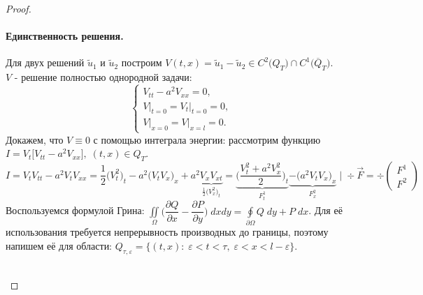 \documentclass[../main.tex]{subfiles}
\begin{document}
\begin{proof}
\paragraph{Единственность решения.}
Для двух решений $\tilde{u}_{1}$ и $\tilde{u}_{2}$  построим $V(t, x) = \tilde{u}_{1} - \tilde{u}_{2} \in C^{2}\bigl(Q_{T}\bigr) \cap C^{1}\bigl(\overline{Q}_{T}\bigr)$.\\$V$ - решение полностью однородной задачи:
\begin{equation*}
\begin{cases}
V_{tt} - a^2V_{xx} = 0, \\
V\bigr|_{t = 0} = V_t\bigr|_{t = 0} = 0, \\
V\bigr|_{x = 0} = V\bigr|_{x = l} = 0.
\end{cases}
\end{equation*}
Докажем, что $V \equiv 0$ с помощью интеграла энергии: рассмотрим функцию $I = V_{t}\bigl[V_{tt} - a^2V_{xx}\bigr],\; (t, x) \in Q_{T}$.
\begin{equation*}
I = V_{t}V_{tt} - a^2V_{t}V_{xx} = \dfrac{1}{2}\bigl(V_{t}^{2}\bigr)_{t} - a^2\bigl(V_{t}V_{x}
\bigr)_{x} + a^2\underbrace{V_{x}V_{xt}}_{\frac{1}{2} \bigl(V_{x}^{2}\bigr)_{t}} = \underbrace{\biggl(\dfrac{V_{t}^2 + a^2V_{x}^{2}}{2}\biggr)_{t}}_{F^1_t}  \underbrace{ - \bigl(a^{2}V_{t}V_{x}\bigr)_{x}}_{F_{x}^{2}}\; \biggr|\; \div\vec{F} = \div \begin{pmatrix}
F^1 \\
F^2
\end{pmatrix}
\end{equation*}
Воспользуемся формулой Грина: $\iint\limits_{\Omega}\bigl(\dfrac{\partial Q}{\partial x} - \dfrac{\partial P}{\partial y}\bigr)\;dxdy = \oint\limits_{\partial \Omega}Q\;dy + P\;dx$.
Для её использования требуется непрерывность производных до границы, поэтому напишем её для области: $Q_{\tau, \varepsilon} = \{(t, x)\colon\; \varepsilon < t < \tau,\; \varepsilon < x < l - \varepsilon\}$.\\
\ \\
\begin{minipage}[c]{0.2\textwidth}
\begin{center}
\end{center}
\end{minipage}
\end{proof}
\end{document}
